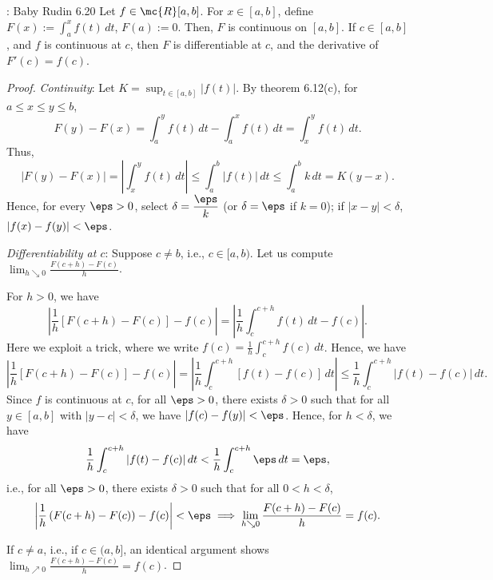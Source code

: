 \begin{ntheorem}{: Baby Rudin 6.20}
	Let \(f\in\mc{R}[a,b]\). For \(x\in[a,b]\), define \(F(x):=\displaystyle\int_a^x f(t) \, dt\), \(F(a):=0\). Then, \(F\) is continuous on \([a,b]\). If \(c\in[a,b]\), and \(f\) is continuous at \(c\), then \(F\) is differentiable at \(c\), and the derivative of \(F'(c)=f(c)\).
\end{ntheorem}
\begin{proof}
	\emph{Continuity}: Let \(K=\displaystyle\sup_{t\in [a,b]}{|f(t)|}\). By theorem 6.12(c), for \(a\leq x\leq y\leq b\), 
	\begin{equation*}
		F(y)-F(x)=\int_a^y f(t) \, dt-\int_a^x f(t) \, dt=\int_x^y f(t) \, dt.
	\end{equation*}
	Thus, 
	\begin{equation*}
		|F(y)-F(x)|=\left|\int_x^y f(t) \, dt\right|\leq \int_a^b |f(t)| \, dt\leq \int_a^b k \, dt=K(y-x).
	\end{equation*}
	Hence, for every \(\eps>0\), select \(\delta=\displaystyle\frac{\eps}{k}\) (or \(\delta=\eps\) if \(k=0\)); if \(|x-y|<\delta\), \(|f(x)-f(y)|<\eps\).
	
	\bigskip
	
	\emph{Differentiability at \(c\)}: Suppose \(c\neq b\), i.e., \(c\in[a,b)\). Let us compute \(\displaystyle\lim_{h\searrow 0}\frac{F(c+h)-F(c)}{h}\). 
	
	\medskip
	
	For \(h>0\), we have 
	\begin{equation*}
		\left|\frac{1}{h}[F(c+h)-F(c)]-f(c)\right|=\left|\frac{1}{h}\int_c^{c+h} f(t) \, dt-f(c)\right|.
	\end{equation*}
	Here we exploit a trick, where we write \(f(c)=\displaystyle\frac{1}{h}\int_c^{c+h}f(c) \, dt\). Hence, we have 
	\begin{equation*}
		\left|\frac{1}{h}[F(c+h)-F(c)]-f(c)\right|=\left|\frac{1}{h}\int_c^{c+h} [f(t)-f(c)] \, dt\right|\leq \frac{1}{h}\int_c^{c+h}|f(t)-f(c)| \, dt.
	\end{equation*}
	Since \(f\) is continuous at \(c\), for all \(\eps>0\), there exists \(\delta>0\) such that for all \(y\in [a,b]\) with \(|y-c|<\delta\), we have \(|f(c)-f(y)|<\eps\). Hence, for \(h<\delta\), we have 
	\begin{equation*}
		\frac{1}{h}\int_c^{c+h}|f(t)-f(c)| \, dt<\frac{1}{h}\int_c^{c+h} \eps \, dt=\eps,
	\end{equation*} 
	i.e., for all \(\eps>0\), there exists \(\delta>0\) such that for all \(0<h<\delta\),
	\begin{equation*}
		\displaystyle\left|\frac{1}{h}\left(F(c+h)-F(c)\right)-f(c)\right|<\eps\implies \displaystyle\lim_{h\searrow 0}\frac{F(c+h)-F(c)}{h}=f(c).
	\end{equation*}
	
	\medskip
	
	If \(c\neq a\), i.e., if \(c\in (a,b]\), an identical argument shows \(\displaystyle\lim_{h\nearrow 0}\frac{F(c+h)-F(c)}{h}=f(c)\).
\end{proof}

